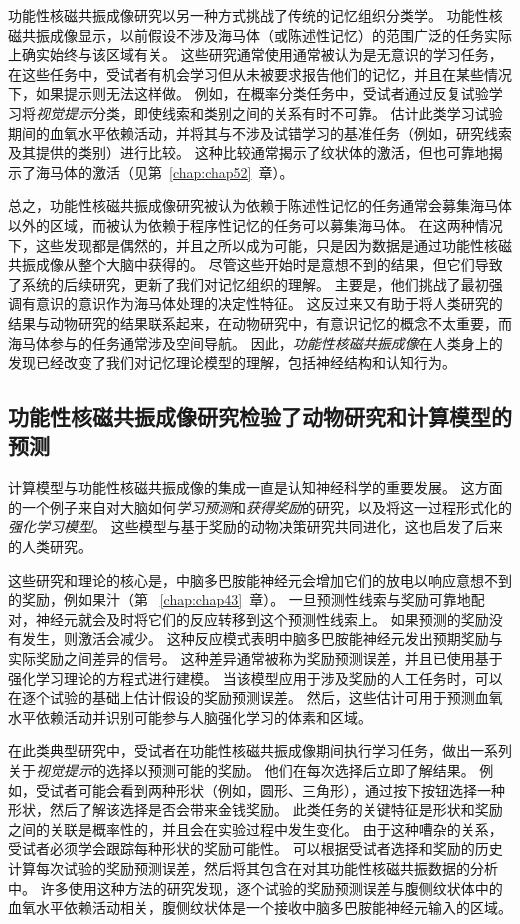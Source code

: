 功能性核磁共振成像研究以另一种方式挑战了传统的记忆组织分类学。
功能性核磁共振成像显示，以前假设不涉及海马体（或陈述性记忆）的范围广泛的任务实际上确实始终与该区域有关。
这些研究通常使用通常被认为是无意识的学习任务，在这些任务中，受试者有机会学习但从未被要求报告他们的记忆，并且在某些情况下，如果提示则无法这样做。
例如，在概率分类任务中，受试者通过反复试验学习将\textit{视觉提示}分类，即使线索和类别之间的关系有时不可靠。
估计此类学习试验期间的血氧水平依赖活动，并将其与不涉及试错学习的基准任务（例如，研究线索及其提供的类别）进行比较。
这种比较通常揭示了纹状体的激活，但也可靠地揭示了海马体的激活（见第~\ref{chap:chap52}~章）。


总之，功能性核磁共振成像研究被认为依赖于陈述性记忆的任务通常会募集海马体以外的区域，而被认为依赖于程序性记忆的任务可以募集海马体。
在这两种情况下，这些发现都是偶然的，并且之所以成为可能，只是因为数据是通过功能性核磁共振成像从整个大脑中获得的。
尽管这些开始时是意想不到的结果，但它们导致了系统的后续研究，更新了我们对记忆组织的理解。
主要是，他们挑战了最初强调有意识的意识作为海马体处理的决定性特征。
这反过来又有助于将人类研究的结果与动物研究的结果联系起来，在动物研究中，有意识记忆的概念不太重要，而海马体参与的任务通常涉及空间导航。
因此，\textit{功能性核磁共振成像}在人类身上的发现已经改变了我们对记忆理论模型的理解，包括神经结构和认知行为。



\subsection{功能性核磁共振成像研究检验了动物研究和计算模型的预测}

计算模型与功能性核磁共振成像的集成一直是认知神经科学的重要发展。
这方面的一个例子来自对大脑如何\textit{学习预测}和\textit{获得奖励}的研究，以及将这一过程形式化的\textit{强化学习模型}。
这些模型与基于奖励的动物决策研究共同进化，这也启发了后来的人类研究。


这些研究和理论的核心是，中脑多巴胺能神经元会增加它们的放电以响应意想不到的奖励，例如果汁（第 ~\ref{chap:chap43}~章）。 
一旦预测性线索与奖励可靠地配对，神经元就会及时将它们的反应转移到这个预测性线索上。
如果预测的奖励没有发生，则激活会减少。
这种反应模式表明中脑多巴胺能神经元发出预期奖励与实际奖励之间差异的信号。
这种差异通常被称为奖励预测误差，并且已使用基于强化学习理论的方程式进行建模。
当该模型应用于涉及奖励的人工任务时，可以在逐个试验的基础上估计假设的奖励预测误差。
然后，这些估计可用于预测血氧水平依赖活动并识别可能参与人脑强化学习的体素和区域。


在此类典型研究中，受试者在功能性核磁共振成像期间执行学习任务，做出一系列关于\textit{视觉提示}的选择以预测可能的奖励。
他们在每次选择后立即了解结果。
例如，受试者可能会看到两种形状（例如，圆形、三角形），通过按下按钮选择一种形状，然后了解该选择是否会带来金钱奖励。
此类任务的关键特征是形状和奖励之间的关联是概率性的，并且会在实验过程中发生变化。
由于这种嘈杂的关系，受试者必须学会跟踪每种形状的奖励可能性。
可以根据受试者选择和奖励的历史计算每次试验的奖励预测误差，然后将其包含在对其功能性核磁共振数据的分析中。
许多使用这种方法的研究发现，逐个试验的奖励预测误差与腹侧纹状体中的血氧水平依赖活动相关，腹侧纹状体是一个接收中脑多巴胺能神经元输入的区域。


